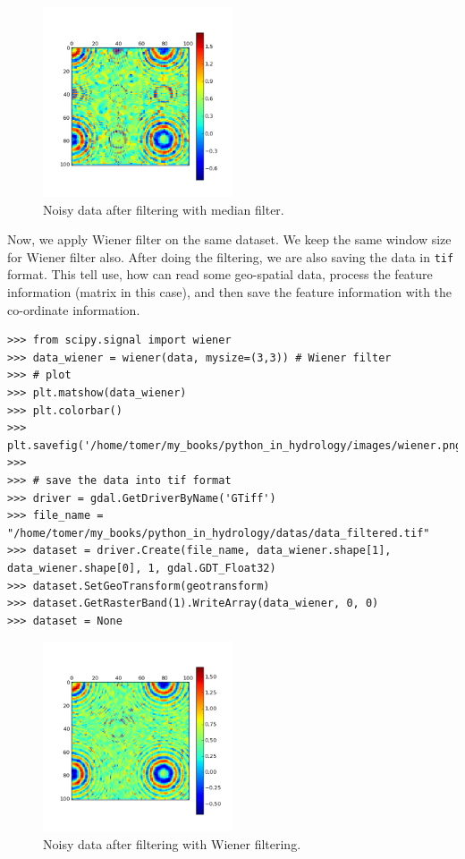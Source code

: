 \documentclass[10pt]{book}
\begin{document}
{\beforefig
\begin{figure}[h!]
  \centering
    \includegraphics[width=0.5\textwidth]{images/median.png}
  \caption{Noisy data after filtering with median filter.}
   \label{fig:median}
\end{figure}
\afterfig
{}
Now, we apply Wiener filter on the same dataset. We keep the same window size for Wiener filter also. After doing the filtering, we are also saving the data in \verb"tif" format. This tell use, how can read some geo-spatial data, process the feature information (matrix in this case), and then save the feature information with the co-ordinate information. 
\beforeverb \begin{verbatim}
>>> from scipy.signal import wiener
>>> data_wiener = wiener(data, mysize=(3,3)) # Wiener filter 
>>> # plot
>>> plt.matshow(data_wiener)
>>> plt.colorbar()
>>> plt.savefig('/home/tomer/my_books/python_in_hydrology/images/wiener.png')
>>> 
>>> # save the data into tif format
>>> driver = gdal.GetDriverByName('GTiff')
>>> file_name = "/home/tomer/my_books/python_in_hydrology/datas/data_filtered.tif"
>>> dataset = driver.Create(file_name, data_wiener.shape[1], data_wiener.shape[0], 1, gdal.GDT_Float32)
>>> dataset.SetGeoTransform(geotransform)
>>> dataset.GetRasterBand(1).WriteArray(data_wiener, 0, 0)
>>> dataset = None
\end{verbatim} \afterverb

\beforefig
\begin{figure}[h!]
  \centering
    \includegraphics[width=0.5\textwidth]{images/wiener.png}
  \caption{Noisy data after filtering with Wiener filtering.}
   \label{fig:wiener}
\end{figure}
\afterfig

}
\end{document}
